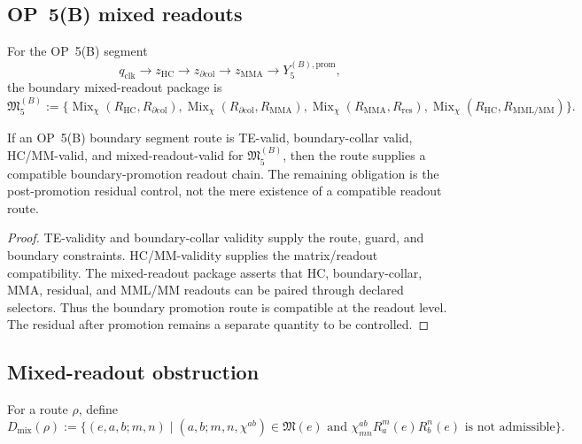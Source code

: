 \subsection{OP~5(B) mixed readouts}
\label{subsec:v410r18-op5b-mixed-readouts}

\begin{definition}
\label{def:v410r18-op5b-boundary-mixed-readout-package}
For the OP~5(B) segment
\[
 q_{\mathrm{clk}}\to z_{\mathrm{HC}}\to z_{\partial\mathrm{col}}\to
 z_{\mathrm{MMA}}\to Y_5^{(B),\mathrm{prom}},
\]
the boundary mixed-readout package is
\[
 \mathfrak M_{5}^{(B)}
 :=
 \{
 \operatorname{Mix}_{\chi}(R_{\mathrm{HC}},R_{\partial\mathrm{col}}),
 \operatorname{Mix}_{\chi}(R_{\partial\mathrm{col}},R_{\mathrm{MMA}}),
 \operatorname{Mix}_{\chi}(R_{\mathrm{MMA}},R_{\mathrm{res}}),
 \operatorname{Mix}_{\chi}(R_{\mathrm{HC}},R_{\mathrm{MML/MM}})
 \}.
\]
\end{definition}

\begin{proposition}
\label{prop:v410r18-op5b-mixed-readout-refinement}
If an OP~5(B) boundary segment route is TE-valid, boundary-collar valid,
HC/MM-valid, and mixed-readout-valid for \(\mathfrak M_{5}^{(B)}\), then the
route supplies a compatible boundary-promotion readout chain. The remaining
obligation is the post-promotion residual control, not the mere existence of a
compatible readout route.
\end{proposition}

\begin{proof}
TE-validity and boundary-collar validity supply the route, guard, and boundary
constraints. HC/MM-validity supplies the matrix/readout compatibility. The
mixed-readout package asserts that HC, boundary-collar, MMA, residual, and
MML/MM readouts can be paired through declared selectors. Thus the boundary
promotion route is compatible at the readout level. The residual after
promotion remains a separate quantity to be controlled.
\end{proof}

\subsection{Mixed-readout obstruction}
\label{subsec:v410r18-mixed-readout-obstruction}

\begin{definition}
\label{def:v410r18-mixed-readout-obstruction}
For a route \(\rho\), define
\[
 D_{\mathrm{mix}}(\rho)
 :=
 \{(e,a,b;m,n)\mid
 (a,b;m,n,\chi^{ab})\in\mathfrak M(e)
 \text{ and }
 \chi^{ab}_{mn}R_a^m(e)R_b^n(e)
 \text{ is not admissible}\}.
\]
\end{definition}

